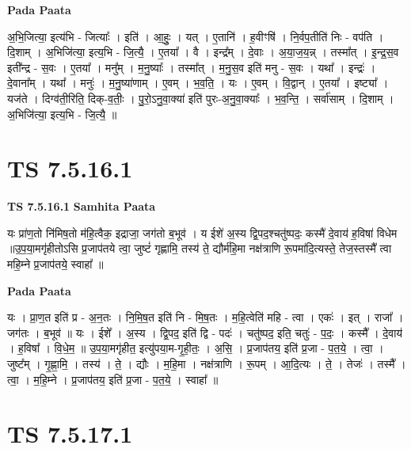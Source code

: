 \documentclass[17pt]{extarticle}
\begin{document}
\textbf{Pada Paata} \newline

अ॒भि॒जित्या॒ इत्य॑भि - जित्याः᳚ । इति॑ । आ॒हुः॒ । यत् । ए॒तानि॑ । ह॒वीꣳषि॑ । नि॒र्वप॒तीति॑ निः - वप॑ति । दि॒शाम् । अ॒भिजि॑त्या॒ इत्य॒भि - जि॒त्यै॒ । ए॒तया᳚ । वै । इन्द्र᳚म् । दे॒वाः । अ॒या॒ज॒य॒न्न् । तस्मा᳚त् । इ॒न्द्र॒स॒व इती᳚न्द्र - स॒वः । ए॒तया᳚ । मनु᳚म् । म॒नु॒ष्याः᳚ । तस्मा᳚त् । म॒नु॒स॒व इति॑ मनु - स॒वः । यथा᳚ । इन्द्रः॑ । दे॒वाना᳚म् । यथा᳚ । मनुः॑ । म॒नु॒ष्या॑णाम् । ए॒वम् । भ॒व॒ति॒ । यः । ए॒वम् । वि॒द्वान् । ए॒तया᳚ । इष्ट्या᳚ । यज॑ते । दिग्व॑ती॒रिति॒ दिक्-व॒तीः॒ । पु॒रो॒ऽनु॒वा॒क्या॑ इति॑ पुरः-अ॒नु॒वा॒क्याः᳚ । भ॒व॒न्ति॒ । सर्वा॑साम् । दि॒शाम् । अ॒भिजि॑त्या॒ इत्य॒भि - जि॒त्यै॒ ॥  \newline




\section*{ TS 7.5.16.1 }

\textbf{TS 7.5.16.1 } \newline
\textbf{Samhita Paata} \newline

यः प्रा॑ण॒तो नि॑मिष॒तो म॑हि॒त्वैक॒ इद्राजा॒ जग॑तो ब॒भूव॑ । य ईशे॑ अ॒स्य द्वि॒पद॒श्चतु॑ष्पदः॒ कस्मै॑ दे॒वाय॑ ह॒विषा॑ विधेम ॥उ॒प॒या॒मगृ॑हीतोऽसि प्र॒जाप॑तये त्वा॒ जुष्टं॑ गृह्णामि॒ तस्य॑ ते॒ द्यौर्म॑हि॒मा नक्ष॑त्राणि रू॒पमा॑दि॒त्यस्ते॒ तेज॒स्तस्मै᳚ त्वा महि॒म्ने प्र॒जाप॑तये॒ स्वाहा᳚ ॥ \newline

\textbf{Pada Paata} \newline

यः । प्रा॒ण॒त इति॑ प्र - अ॒न॒तः । नि॒मि॒ष॒त इति॑ नि - मि॒ष॒तः । म॒हि॒त्वेति॑ महि - त्वा । एकः॑ । इत् । राजा᳚ । जग॑तः । ब॒भूव॑ ॥ यः । ईशे᳚ । अ॒स्य । द्वि॒पद॒ इति॑ द्वि - पदः॑ । चतु॑ष्पद॒ इति॒ चतुः॑ - प॒दः॒ । कस्मै᳚ । दे॒वाय॑ । ह॒विषा᳚ । वि॒धे॒म॒ ॥ उ॒प॒या॒मगृ॑हीत॒ इत्यु॑पया॒म-गृ॒ही॒तः॒ । अ॒सि॒ । प्र॒जाप॑तय॒ इति॑ प्र॒जा - प॒त॒ये॒ । त्वा॒ । जुष्ट᳚म् । गृ॒ह्णा॒मि॒ । तस्य॑ । ते॒ । द्यौः । म॒हि॒मा । नक्ष॑त्राणि । रू॒पम् । आ॒दि॒त्यः । ते॒ । तेजः॑ । तस्मै᳚ । त्वा॒ । म॒हि॒म्ने । प्र॒जाप॑तय॒ इति॑ प्र॒जा - प॒त॒ये॒ । स्वाहा᳚ ॥  \newline




\section*{ TS 7.5.17.1 }
\end{document}
